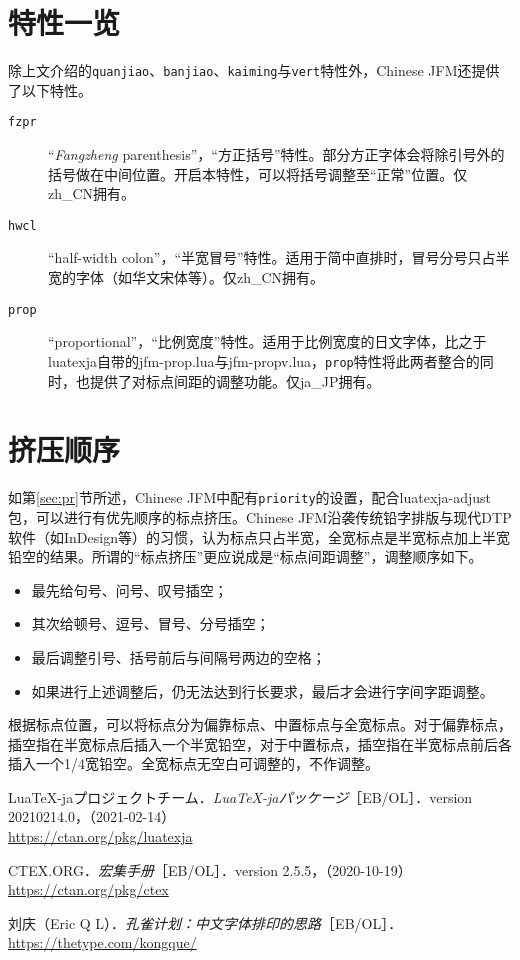 \documentclass[a4paper , zihao=-4 , fontset=adobe , punct=zh_CN/kaiming]{ctexart}
\begin{document}
\section{特性一览}
除上文介绍的\+\verb|quanjiao|、\verb|banjiao|、\verb|kaiming|与\+\verb|vert|特性外，\textsf{Chinese JFM}还提供了以下特性。

\begin{description}
    \item[\texttt{fzpr}] “\textit{Fangzheng} parenthesis”，“方正括号”特性。部分方正字体会将除引号外的括号做在中间位置。开启本特性，可以将括号调整至“正常”位置。仅\textsf{zh\_CN}拥有。
    \item[\texttt{hwcl}] “half-width colon”，“半宽冒号”特性。适用于简中直排时，冒号分号只占半宽的字体（如华文宋体等）。仅\textsf{zh\_CN}拥有。
    \item[\texttt{prop}] “proportional”，“比例宽度”特性。适用于比例宽度的日文字体，比之于\textsf{lua\-texja}自带的\textsf{jfm-prop.lua}与\textsf{jfm-propv.lua}，\verb|prop|特性将此两者整合的同时，也提供了对标点间距的调整功能。仅\textsf{ja\_JP}拥有。
\end{description}

\section{挤压顺序}
如第\ref{sec:pr}节所述，\textsf{Chinese JFM}中配有\+\verb|priority|的设置，配合\textsf{luatexja-adjust}包，可以进行有优先顺序的标点挤压。\textsf{Chinese JFM}沿袭传统铅字排版与现代DTP软件（如InDesign等）的习惯，认为标点只占半宽，全宽标点是半宽标点加上半宽铅空的结果。所谓的“标点挤压”更应说成是“标点间距调整”，调整顺序如下。
\begin{itemize}
    \item 最先给句号、问号、叹号插空；
    \item 其次给顿号、逗号、冒号、分号插空；
    \item 最后调整引号、括号前后与间隔号两边的空格；
    \item 如果进行上述调整后，仍无法达到行长要求，最后才会进行字间字距调整。
\end{itemize}

根据标点位置，可以将标点分为偏靠标点、中置标点与全宽标点。对于偏靠标点，插空指在半宽标点后插入一个半宽铅空，对于中置标点，插空指在半宽标点前后各插入一个1/4宽铅空。全宽标点无空白可调整的，不作调整。

\nocite{*}
\begin{thebibliography}{9}
 Lua\TeX-jaプロジェクトチーム．\textit{Lua\TeX-jaパッケージ}［EB/OL］．version 20210214.0，（2021-02-14）\\\mbox{}
\hfill\url{https://ctan.org/pkg/luatexja}

 CTEX.ORG．\textit{\CTeX{}宏集手册}［EB/OL］．version 2.5.5，（2020-10-19）\\\mbox{}
\hfill\url{https://ctan.org/pkg/ctex}

 刘庆（Eric Q L）．\textit{孔雀计划：中文字体排印的思路}［EB/OL］．\\\mbox{}
\hfill\url{https://thetype.com/kongque/}
\end{thebibliography}
\end{document}
